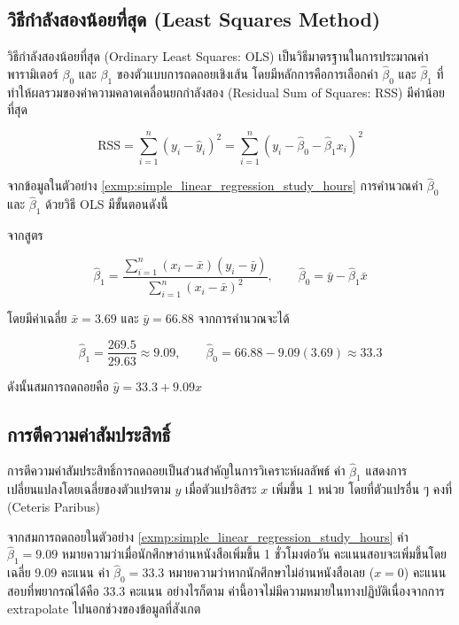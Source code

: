 \subsection{วิธีกำลังสองน้อยที่สุด (Least Squares Method)}
วิธีกำลังสองน้อยที่สุด (Ordinary Least Squares: OLS) เป็นวิธีมาตรฐานในการประมาณค่าพารามิเตอร์ $\beta_0$ และ $\beta_1$ ของตัวแบบการถดถอยเชิงเส้น โดยมีหลักการคือการเลือกค่า $\hat{\beta}_0$ และ $\hat{\beta}_1$ ที่ทำให้ผลรวมของค่าความคลาดเคลื่อนยกกำลังสอง (Residual Sum of Squares: RSS) มีค่าน้อยที่สุด

\[
\text{RSS} = \sum_{i=1}^{n}(y_i - \hat{y}_i)^2 = \sum_{i=1}^{n}\left(y_i - \hat{\beta}_0 - \hat{\beta}_1 x_i\right)^2
\]

\begin{exmp}
\label{exmp:ols_calculation}
จากข้อมูลในตัวอย่าง \ref{exmp:simple_linear_regression_study_hours} การคำนวณค่า $\hat{\beta}_0$ และ $\hat{\beta}_1$ ด้วยวิธี OLS มีขั้นตอนดังนี้

จากสูตร

\[
\hat{\beta}_1 = \frac{\sum_{i=1}^{n}(x_i - \bar{x})(y_i - \bar{y})}{\sum_{i=1}^{n}(x_i - \bar{x})^2}, \qquad
\hat{\beta}_0 = \bar{y} - \hat{\beta}_1 \bar{x}
\]

โดยมีค่าเฉลี่ย $\bar{x} = 3.69$ และ $\bar{y} = 66.88$ จากการคำนวณจะได้

\[
\hat{\beta}_1 = \frac{269.5}{29.63} \approx 9.09, \qquad \hat{\beta}_0 = 66.88 - 9.09(3.69) \approx 33.3
\]

ดังนั้นสมการถดถอยคือ $\hat{y} = 33.3 + 9.09x$
\end{exmp}

\subsection{การตีความค่าสัมประสิทธิ์}
การตีความค่าสัมประสิทธิ์การถดถอยเป็นส่วนสำคัญในการวิเคราะห์ผลลัพธ์ ค่า $\hat{\beta}_1$ แสดงการเปลี่ยนแปลงโดยเฉลี่ยของตัวแปรตาม $y$ เมื่อตัวแปรอิสระ $x$ เพิ่มขึ้น 1 หน่วย โดยที่ตัวแปรอื่น ๆ คงที่ (Ceteris Paribus)

\begin{exmp}
\label{exmp:coefficient_interpretation}
จากสมการถดถอยในตัวอย่าง \ref{exmp:simple_linear_regression_study_hours} ค่า $\hat{\beta}_1 = 9.09$ หมายความว่าเมื่อนักศึกษาอ่านหนังสือเพิ่มขึ้น 1 ชั่วโมงต่อวัน คะแนนสอบจะเพิ่มขึ้นโดยเฉลี่ย 9.09 คะแนน ค่า $\hat{\beta}_0 = 33.3$ หมายความว่าหากนักศึกษาไม่อ่านหนังสือเลย ($x = 0$) คะแนนสอบที่พยากรณ์ได้คือ 33.3 คะแนน อย่างไรก็ตาม ค่านี้อาจไม่มีความหมายในทางปฏิบัติเนื่องจากการ extrapolate ไปนอกช่วงของข้อมูลที่สังเกต
\end{exmp}

